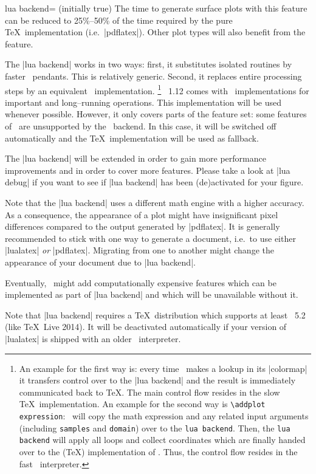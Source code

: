 {\begin{pgfplotskey}{lua backend= (initially true)}
	The time to generate surface plots with this feature can be reduced to 25\%--50\% of the time required by the pure \TeX\ implementation (i.e.\ |pdflatex|). Other plot types will also benefit from the feature.

	The |lua backend| works in two ways: first, it substitutes isolated routines by faster \lua\ pendants. This is relatively generic. Second, it replaces entire processing steps by an equivalent \lua\ implementation.%
	\footnote{
	An example for the first way is: every time \PGFPlots\ makes a lookup in its |colormap| it transfers control over to the |lua backend| and the result is immediately communicated back to \TeX. The main control flow resides in the slow \TeX\ implementation. An example for the second way is \texttt{\textbackslash addplot expression}: \PGFPlots\ will copy the math expression and any related input arguments (including  \texttt{samples} and \texttt{domain}) over to the \texttt{lua backend}. Then, the \texttt{lua backend} will apply all loops and collect coordinates which are finally handed over to the (\TeX) implementation of \pgfname. Thus, the control flow resides in the fast \lua\ interpreter.
	}	
	\PGFPlots\ 1.12 comes with \lua\ implementations for important and long--running operations. This implementation will be used whenever possible. However, it only covers parts of the feature set: some features of \PGFPlots\ are unsupported by the \lua\ backend. In this case, it will be switched off automatically and the \TeX\ implementation will be used as fallback.

	The |lua backend| will be extended in order to gain more performance improvements and in order to cover more features. Please take a look at |lua debug| if you want to see if |lua backend| has been (de)activated for your figure.

	Note that the |lua backend| uses a different math engine with a higher accuracy. As a consequence, the appearance of a plot might have insignificant pixel differences compared to the output generated by |pdflatex|. It is generally recommended to stick with one way to generate a document, i.e.\ to use either |lualatex| \emph{or} |pdflatex|. Migrating from one to another might change the appearance of your document due to |lua backend|.

	Eventually, \PGFPlots\ might add computationally expensive features which can be implemented as part of |lua backend| and which will be unavailable without it.

	Note that |lua backend| requires a \TeX\ distribution which supports at least \lua~5.2 (like \TeX\ Live 2014). It will be deactivated automatically if your version of |lualatex| is shipped with an older \lua\ interpreter.


\end{pgfplotskey}}
